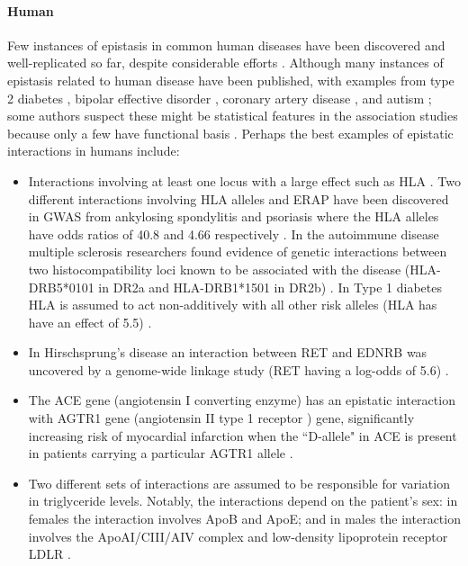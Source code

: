 \paragraph{Human}
Few instances of epistasis in common human diseases have been discovered and well-replicated so far, despite considerable efforts \cite{zuk2012mystery}.
Although many instances of epistasis related to human disease have been published, with examples from type 2 diabetes \cite{wiltshire2006epistasis}, bipolar effective disorder \cite{jamra2007first}, coronary artery disease \cite{tsai2007renin}, and autism \cite{coutinho2007evidence}; some authors suspect these might be statistical features in the association studies because only a few have functional basis \cite{phillips2008epistasis}.
Perhaps the best examples of epistatic interactions in humans include:
\begin{itemize}
	\item Interactions involving at least one locus with a large effect such as HLA  \cite{zuk2012mystery}.
Two different interactions involving HLA alleles and ERAP have been discovered in GWAS from ankylosing spondylitis and psoriasis where the HLA alleles have odds ratios of 40.8 and 4.66 respectively \cite{evans2011interaction, genetic2010genome}.
In the autoimmune disease multiple sclerosis researchers found evidence of genetic interactions between two histocompatibility loci known to be associated with the disease (HLA-DRB5*0101 in DR2a and HLA-DRB1*1501 in DR2b) \cite{gregersen2006functional}. 
In Type 1 diabetes HLA is assumed to act non-additively with all other risk alleles (HLA has have an effect of 5.5) \cite{barrett2009genome}.

	\item In Hirschsprung's disease an interaction between RET and EDNRB was uncovered by a genome-wide linkage study (RET having a log-odds of 5.6) \cite{carrasquillo2002genome}.

	\item The ACE gene (angiotensin I converting enzyme) has an epistatic interaction with AGTR1 gene (angiotensin II type 1 receptor ) gene, significantly increasing risk of myocardial infarction when the ``D-allele" in ACE  is present in patients carrying a particular AGTR1 allele \cite{tiret1994synergistic}.

	\item Two different sets of interactions are assumed to be responsible for variation in triglyceride levels.
Notably, the interactions depend on the patient's sex: in females the interaction involves ApoB and ApoE;  and in males the interaction involves the ApoAI/CIII/AIV complex and low-density lipoprotein receptor LDLR \cite{nelson2001combinatorial}.


\end{itemize}
